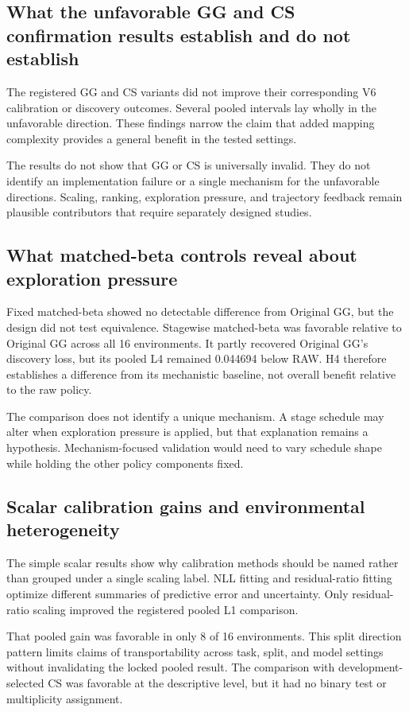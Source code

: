 \documentclass[10pt]{article}
\begin{document}
\subsection{What the unfavorable GG and CS confirmation results establish and do not establish}
The registered GG and CS variants did not improve their corresponding V6
calibration or discovery outcomes. Several pooled intervals lay wholly in the
unfavorable direction. These findings narrow the claim that added mapping
complexity provides a general benefit in the tested settings.

The results do not show that GG or CS is universally invalid. They do not
identify an implementation failure or a single mechanism for the unfavorable
directions. Scaling, ranking, exploration pressure, and trajectory feedback
remain plausible contributors that require separately designed studies.

\subsection{What matched-beta controls reveal about exploration pressure}
Fixed matched-beta showed no detectable difference from Original GG, but the
design did not test equivalence. Stagewise matched-beta was favorable relative
to Original GG across all 16 environments. It partly recovered Original GG's
discovery loss, but its pooled L4 remained 0.044694 below RAW. H4 therefore
establishes a difference from its mechanistic baseline, not overall benefit
relative to the raw policy.

The comparison does not identify a unique mechanism. A stage schedule may
alter when exploration pressure is applied, but that explanation remains a
hypothesis. Mechanism-focused validation would need to vary schedule shape
while holding the other policy components fixed.

\subsection{Scalar calibration gains and environmental heterogeneity}
The simple scalar results show why calibration methods should be named rather
than grouped under a single scaling label. NLL fitting and residual-ratio
fitting optimize different summaries of predictive error and uncertainty.
Only residual-ratio scaling improved the registered pooled L1 comparison.

That pooled gain was favorable in only 8 of 16 environments. This split
direction pattern limits claims of transportability across task, split, and
model settings without invalidating the locked pooled result. The comparison
with development-selected CS was favorable at the descriptive level, but it
had no binary test or multiplicity assignment.
\end{document}
